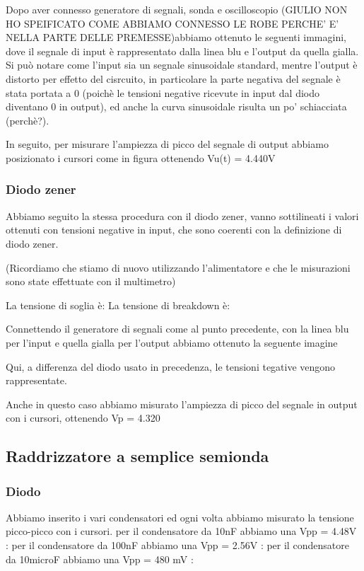 \documentclass[a4paper]{article}
\begin{document}
{{			%
			
			Dopo aver connesso generatore di segnali, sonda e oscilloscopio (GIULIO NON HO SPEIFICATO COME ABBIAMO CONNESSO LE ROBE PERCHE' E' NELLA PARTE DELLE PREMESSE)abbiamo ottenuto le seguenti immagini, dove il segnale di input è rappresentato dalla linea blu e l'output da quella gialla. 
			Si può notare come l'input sia un segnale sinusoidale standard, mentre l'output è distorto per effetto del cisrcuito, in particolare la parte negativa del segnale è stata portata a 0 (poichè le tensioni negative ricevute in input dal diodo diventano 0 in output), ed anche la curva sinusoidale risulta un po' schiacciata (perchè?).
			
			In seguito, per misurare l'ampiezza di picco del segnale di output abbiamo posizionato i cursori come in figura ottenendo Vu(t) = 4.440V %
			
			\subsubsection{Diodo zener}
			Abbiamo seguito la stessa procedura con il diodo zener, vanno sottilineati i valori ottenuti con tensioni negative in input, che sono coerenti con la definizione di diodo zener.

			(Ricordiamo che stiamo di nuovo utilizzando l'alimentatore e che le misurazioni sono state effettuate con il multimetro)

		La tensione di soglia è: 
		La tensione di breakdown è:
		
		Connettendo il generatore di segnali come al punto precedente, con la linea blu per l'input e quella gialla per l'output abbiamo ottenuto la seguente imagine
		
		Qui, a differenza del diodo usato in precedenza, le tensioni tegative vengono rappresentate.		
		
		Anche in questo caso abbiamo misurato l'ampiezza di picco del segnale in output con i cursori, ottenendo Vp = 4.320 %
		
		\subsection{Raddrizzatore a semplice semionda}
			\subsubsection{Diodo}
				Abbiamo inserito i vari condensatori ed ogni volta abbiamo misurato la tensione picco-picco con i cursori.
				per il condensatore da 10nF abbiamo una Vpp = 4.48V :
				per il condensatore da 100nF abbiamo una Vpp = 2.56V :
				per il condensatore da 10microF abbiamo una Vpp = 480 mV :
				
}}
\end{document}
